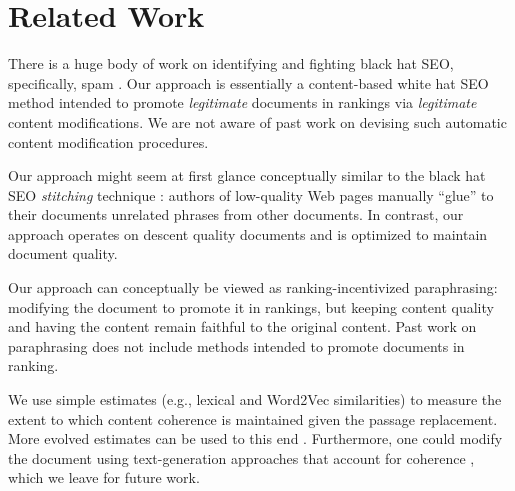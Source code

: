 \section{Related Work}
\label{sec:rel}
There is a huge body of work on identifying and fighting black hat SEO, specifically,
spam \cite{AIRWeb,Castillo+Davison:10a}. Our 
approach is essentially a content-based white hat SEO method intended to promote
{\em legitimate} documents in rankings via {\em legitimate}
content modifications. We are not aware of past work on devising such
automatic content modification procedures. 

Our approach might seem at first glance conceptually similar to
the black hat SEO {\em stitching} technique \cite{Gyongyi+Molina:05a}:
authors of low-quality Web pages manually ``glue'' to their
documents unrelated phrases from other documents. In contrast, our approach operates on descent quality
documents and is optimized to maintain document quality.

Our approach can conceptually be viewed as ranking-incentivized
paraphrasing: modifying the document to promote
it in rankings, but keeping content quality and having the content remain faithful to the original content. Past work on paraphrasing
\cite{Androutsopoulos+Malakasiotis:10a} does not include methods
intended to promote documents in ranking.

We use simple estimates (e.g., lexical and Word2Vec similarities) to
measure the extent to which content coherence is maintained given the passage
replacement. More evolved estimates can be used to this end \cite{graesser2004coh,lapata2005automatic,pitler2008revisiting,lin2011automatically,li2016neural}. Furthermore, one could modify the document using text-generation approaches that account for coherence \cite{kiddon2016globally,ji2016latent,guo2018long}, which we leave for future work.

\endinput

There is a line of work on query-biased/focused content summarization
(e.g., \cite{Tombros+Sanderson:98a,Berger+Mittal:00a}). The main goal
of these methods is to create snippets that can help users of search
engines understand the relevance of retrieved documents to their
queries. In contrast, our approach does not create a short summary of
the given document, but rather modifies it for rank-promotion while maintaining coherence.





